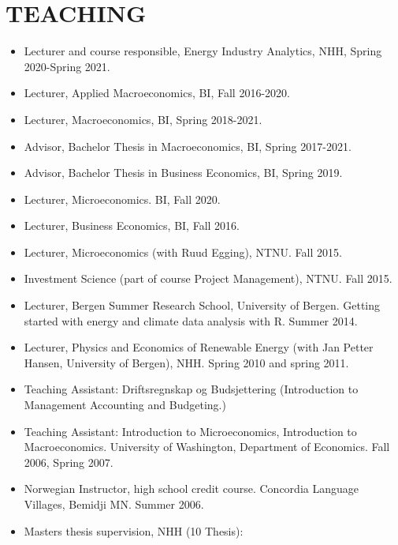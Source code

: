 \documentclass[margin]{res}
\begin{document}
\section{TEACHING}
\begin{itemize}
\setlength{\itemsep}{10pt}
\item[] Lecturer and course responsible, Energy Industry Analytics, NHH, Spring 2020-Spring 2021.
\item[] Lecturer, Applied Macroeconomics, BI, Fall 2016-2020.
\item[] Lecturer, Macroeconomics, BI, Spring 2018-2021.
\item[] Advisor, Bachelor Thesis in Macroeconomics, BI, Spring 2017-2021.
\item[] Advisor, Bachelor Thesis in Business Economics, BI, Spring 2019.
\item[] Lecturer, Microeconomics. BI,  Fall 2020.
\item[] Lecturer, Business Economics, BI, Fall 2016.
\item[] Lecturer, Microeconomics (with Ruud Egging), NTNU.  Fall 2015.
\item[] Investment Science (part of course Project Management), NTNU.  Fall 2015.
\item[] Lecturer, Bergen Summer Research School, University of Bergen.  Getting started with energy and climate data analysis with R.  Summer 2014.
\item[] Lecturer, Physics and Economics of Renewable Energy (with Jan Petter Hansen, University of Bergen), NHH.  Spring 2010 and spring 2011.
\item[] Teaching Assistant: Driftsregnskap og Budsjettering (Introduction to Management Accounting and Budgeting.)
\item[] Teaching Assistant: Introduction to Microeconomics, Introduction to Macroeconomics.  University of Washington, Department of Economics. Fall 2006, Spring 2007.
\item[] Norwegian Instructor, high school credit course.  Concordia Language Villages, Bemidji MN.  Summer 2006.
\item [] Masters thesis supervision, NHH (10 Thesis):

\end{itemize}
\end{document}
